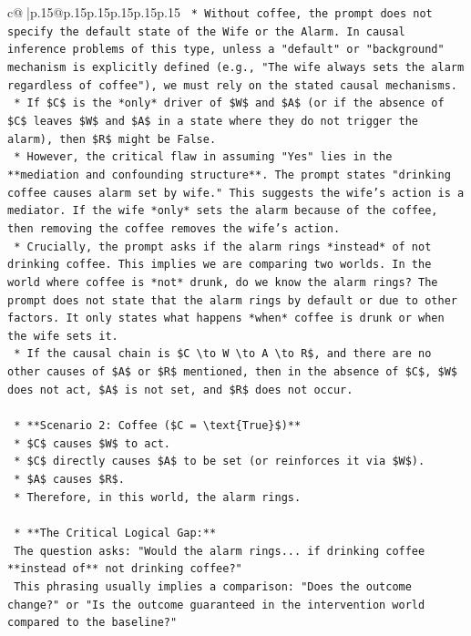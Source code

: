 \documentclass{article}
\begin{document}
{\begin{supertabular}{c@{$\;$}|p{.15\linewidth}@{}p{.15\linewidth}p{.15\linewidth}p{.15\linewidth}p{.15\linewidth}p{.15\linewidth}}
{{{\texttt{        *   Without coffee, the prompt does not specify the default state of the Wife or the Alarm. In causal inference problems of this type, unless a "default" or "background" mechanism is explicitly defined (e.g., "The wife always sets the alarm regardless of coffee"), we must rely on the stated causal mechanisms.} \\
\texttt{        *   If \$C\$ is the *only* driver of \$W\$ and \$A\$ (or if the absence of \$C\$ leaves \$W\$ and \$A\$ in a state where they do not trigger the alarm), then \$R\$ might be False.} \\
\texttt{        *   However, the critical flaw in assuming "Yes" lies in the **mediation and confounding structure**. The prompt states "drinking coffee causes alarm set by wife." This suggests the wife's action is a mediator. If the wife *only* sets the alarm because of the coffee, then removing the coffee removes the wife's action.} \\
\texttt{        *   Crucially, the prompt asks if the alarm rings *instead* of not drinking coffee. This implies we are comparing two worlds. In the world where coffee is *not* drunk, do we know the alarm rings? The prompt does not state that the alarm rings by default or due to other factors. It only states what happens *when* coffee is drunk or when the wife sets it.} \\
\texttt{        *   If the causal chain is \$C \textbackslash{}to W \textbackslash{}to A \textbackslash{}to R\$, and there are no other causes of \$A\$ or \$R\$ mentioned, then in the absence of \$C\$, \$W\$ does not act, \$A\$ is not set, and \$R\$ does not occur.} \\
\\ 
\texttt{    *   **Scenario 2: Coffee (\$C = \textbackslash{}text\{True\}\$)**} \\
\texttt{        *   \$C\$ causes \$W\$ to act.} \\
\texttt{        *   \$C\$ directly causes \$A\$ to be set (or reinforces it via \$W\$).} \\
\texttt{        *   \$A\$ causes \$R\$.} \\
\texttt{        *   Therefore, in this world, the alarm rings.} \\
\\ 
\texttt{    *   **The Critical Logical Gap:**} \\
\texttt{        The question asks: "Would the alarm rings... if drinking coffee **instead of** not drinking coffee?"} \\
\texttt{        This phrasing usually implies a comparison: "Does the outcome change?" or "Is the outcome guaranteed in the intervention world compared to the baseline?"} \\
}}}
\end{supertabular}}
\end{document}
